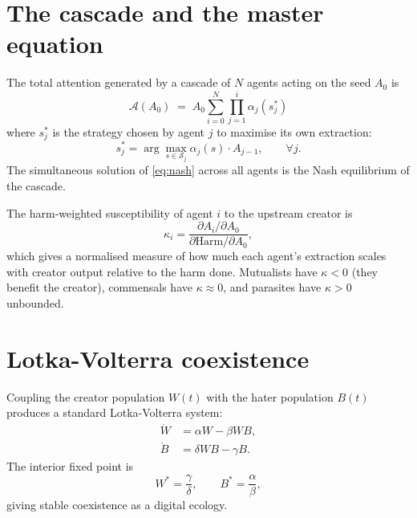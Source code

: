 \documentclass[12pt,a4paper]{article}
\begin{document}
\section{The cascade and the master equation}
\label{sec:cascade}

The total attention generated by a cascade of $N$ agents acting on the seed $A_0$ is
\begin{equation}
  \boxed{\quad \mathcal{A}(A_0) \;=\; A_0 \sum_{i=0}^{N} \prod_{j=1}^{i} \alpha_j(s_j^{*}) \quad}
  \label{eq:master}
\end{equation}
where $s_j^{*}$ is the strategy chosen by agent $j$ to maximise its own extraction:
\begin{equation}
  s_j^{*} = \arg \max_{s \in \mathcal{S}_j} \alpha_j(s) \cdot A_{j-1}, \qquad \forall j.
  \label{eq:nash}
\end{equation}
The simultaneous solution of \eqref{eq:nash} across all agents is the Nash equilibrium of the cascade.

The harm-weighted susceptibility of agent $i$ to the upstream creator is
\begin{equation}
  \kappa_i = \frac{\partial A_i / \partial A_0}{\partial \mathrm{Harm} / \partial A_0},
  \label{eq:kappa}
\end{equation}
which gives a normalised measure of how much each agent's extraction scales with creator output relative to the harm done. Mutualists have $\kappa < 0$ (they benefit the creator), commensals have $\kappa \approx 0$, and parasites have $\kappa > 0$ unbounded.

\section{Lotka-Volterra coexistence}
\label{sec:lv}

Coupling the creator population $W(t)$ with the hater population $B(t)$ produces a standard Lotka-Volterra system:
\begin{align}
  \dot{W} &= \alpha W - \beta W B, \label{eq:lv1} \\
  \dot{B} &= \delta W B - \gamma B. \label{eq:lv2}
\end{align}
The interior fixed point is
\begin{equation}
  W^{*} = \frac{\gamma}{\delta}, \qquad B^{*} = \frac{\alpha}{\beta},
  \label{eq:lv_eq}
\end{equation}
giving stable coexistence as a digital ecology.
\end{document}
